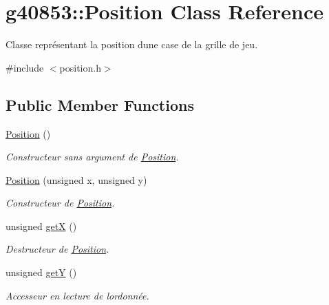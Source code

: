 \hypertarget{classg40853_1_1_position}{}\section{g40853\+:\+:Position Class Reference}
\label{classg40853_1_1_position}


Classe représentant la position d\textquotesingle{}une case de la grille de jeu.  




{\ttfamily \#include $<$position.\+h$>$}

\subsection*{Public Member Functions}
\begin{DoxyCompactItemize}
\item 
\hypertarget{classg40853_1_1_position_aec6d7dfcf1d960f213e53f4404c6a1a4}{}\label{classg40853_1_1_position_aec6d7dfcf1d960f213e53f4404c6a1a4} 
\hyperlink{classg40853_1_1_position_aec6d7dfcf1d960f213e53f4404c6a1a4}{Position} ()
\begin{DoxyCompactList}\small\item\em Constructeur sans argument de \hyperlink{classg40853_1_1_position}{Position}. \end{DoxyCompactList}\item 
\hyperlink{classg40853_1_1_position_a1e68bc9f15d9a52a4151537df34858b8}{Position} (unsigned x, unsigned y)
\begin{DoxyCompactList}\small\item\em Constructeur de \hyperlink{classg40853_1_1_position}{Position}. \end{DoxyCompactList}\item 
unsigned \hyperlink{classg40853_1_1_position_a1e7bd91fa0db9bee5674d454cd6a6b69}{getX} ()
\begin{DoxyCompactList}\small\item\em Destructeur de \hyperlink{classg40853_1_1_position}{Position}. \end{DoxyCompactList}\item 
unsigned \hyperlink{classg40853_1_1_position_a7bba87fac1407b339f6d9a917f8b19ab}{getY} ()
\begin{DoxyCompactList}\small\item\em Accesseur en lecture de l\textquotesingle{}ordonnée. \end{DoxyCompactList}\item 

\end{DoxyCompactItemize}
